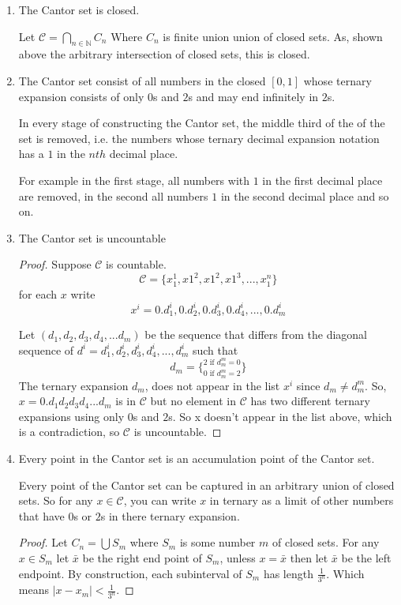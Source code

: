 \documentclass{tufte-book}
\theoremstyle{mytheoremstyle}
\theoremstyle{mylemstyle}
\theoremstyle{mydefstyle}
\begin{document}
\begin{enumerate}

\item The Cantor set is closed.

Let $\mathcal{C} = \bigcap\limits_{n \in \mathbb{N}}C_n$ Where $C_n$ is finite union union of closed sets.  As, shown above the arbitrary intersection of closed sets, this is closed.

\item The Cantor set consist of all  numbers in the closed $[0,1]$ whose ternary expansion consists of only $0$s and $2$s and may end infinitely in $2$s.

In every stage of constructing the Cantor set, the middle third of the of the set is removed, i.e. the numbers whose ternary decimal expansion notation has a $1$ in the $nth$ decimal place.

For example in the first stage, all numbers with $1$ in the first decimal place are removed, in the second all numbers $1$ in the second decimal place and so on.

\item The Cantor set is uncountable

\begin{proof}
Suppose $\mathcal{C}$ is countable.
\[\mathcal{C} = \{x_1^1, x1^2, x1^2, x1^3, ..., x_1^n\}\]
for each $x$ write
\[x^i = 0.d_1^i,0.d_2^i,0.d_3^i,0.d_4^i,...,0.d_m^i \]

Let $(d_1, d_2, d_3, d_4,...d_m)$ be the sequence that differs from the diagonal sequence of $d^i= d_1^i, d_2^i, d_3^i, d_4^i,...,d_m^i$ such that
\[d_m = \{_{0 \text{ if } d^m_m = 2}^{2 \text{ if } d^m_m = 0} \}\]
The ternary expansion $d_m$, does not appear in the list $x^i$ since $d_m \neq d_m^m$.  So, $x=0.d_1d_2d_3d_4...d_m$ is in $\mathcal{C}$ but no element in $\mathcal{C}$ has two different ternary expansions using only $0$s and $2$s. So x doesn't appear in the list above, which is a contradiction, so $\mathcal{C}$ is uncountable.

\end{proof}


\item Every point in the Cantor set is an accumulation point of the Cantor set.

Every point of the Cantor set can be captured in an arbitrary union of closed sets.  So for any $x \in \mathcal{C}$, you can write $x$ in ternary as a limit of other numbers that have $0$s or $2$s in there ternary expansion. 

\begin{proof}
Let $C_n = \bigcup S_m$ where $S_m$ is some number $m$ of closed sets. For any $x \in S_m$ let $\bar{x}$ be the right end point of $S_m$, unless $x = \bar{x}$ then let $\bar{x}$ be the left endpoint. By construction, each subinterval of $S_m$ has length $\frac{1}{3^n}$.  Which means $|x - x_m| < \frac{1}{3^n}$.


\end{proof}
\end{enumerate}
\end{document}

